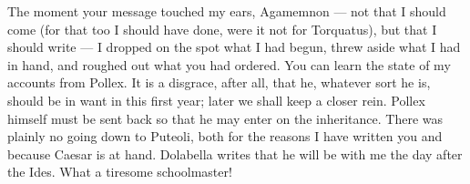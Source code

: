 

 The moment your message touched my ears, Agamemnon --- not that I should come (for that too I should have done, were it not for Torquatus), but that I should write --- I dropped on the spot what I had begun, threw aside what I had in hand, and roughed out what you had ordered. You can learn the state of my accounts from Pollex. It is a disgrace, after all, that he, whatever sort he is, should be in want in this first year; later we shall keep a closer rein. Pollex himself must be sent back so that he may enter on the inheritance. There was plainly no going down to Puteoli, both for the reasons I have written you and because Caesar is at hand. Dolabella writes that he will be with me the day after the Ides. What a tiresome schoolmaster!
